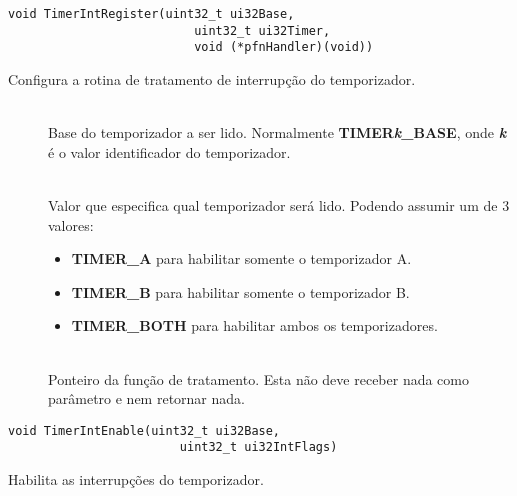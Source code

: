 \begin{lstlisting}[style=funcao]
	void TimerIntRegister(uint32_t ui32Base,
						  uint32_t ui32Timer,
						  void (*pfnHandler)(void))
\end{lstlisting}

Configura a rotina de tratamento de interrupção do temporizador.

\begin{description}
	\item []\hfill \\
	Base do temporizador a ser lido. Normalmente \textbf{TIMER\emph{k}\_BASE}, onde \textbf{\emph{k}} é o valor identificador do temporizador.
	
	\item []\hfill \\
	Valor que especifica qual temporizador será lido. Podendo assumir um de 3 valores:
	\begin{itemize}
		\item \textbf{TIMER\_A} para habilitar somente o temporizador A.
		\item \textbf{TIMER\_B} para habilitar somente o temporizador B.
		\item \textbf{TIMER\_BOTH} para habilitar ambos os temporizadores.
	\end{itemize}
	
	\item []\hfill \\
	Ponteiro da função de tratamento. Esta não deve receber nada como parâmetro e nem retornar nada.
\end{description}

\begin{lstlisting}[style=funcao]
	void TimerIntEnable(uint32_t ui32Base,
						uint32_t ui32IntFlags)
\end{lstlisting}

Habilita as interrupções do temporizador.

